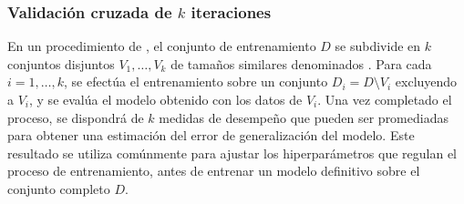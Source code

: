 %
\subsubsection{Validación cruzada de $k$ iteraciones}
%
En un procedimiento de 
\cite{crossval}, el conjunto de entrenamiento $D$ se subdivide en $k$
conjuntos disjuntos $V_1,\ldots,V_k$ de tamaños similares denominados
.
Para cada $i=1,\ldots,k$, se efectúa el entrenamiento sobre un
conjunto $D_i=D\setminus{}V_i$ excluyendo a $V_i$, y se evalúa el
modelo obtenido con los datos de $V_i$.  Una vez completado el
proceso, se dispondrá de $k$ medidas de desempeño que pueden ser
promediadas para obtener una estimación del error de generalización
del modelo. Este resultado se utiliza comúnmente para ajustar los
hiperparámetros que regulan el proceso de entrenamiento, antes de
entrenar un modelo definitivo sobre el conjunto completo $D$.

